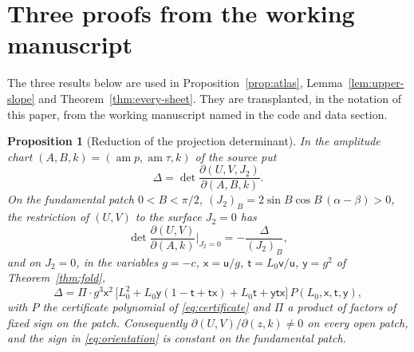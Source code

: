 \documentclass[11pt]{article}
\newtheorem{proposition}[theorem]{Proposition}
\theoremstyle{remark}
\newcommand{\am}{\operatorname{am}}
\begin{document}
\appendix
\section{Three proofs from the working manuscript}\label{app:proofs}

The three results below are used in Proposition~\ref{prop:atlas},
Lemma~\ref{lem:upper-slope} and Theorem~\ref{thm:every-sheet}.  They are
transplanted, in the notation of this paper, from the working manuscript
named in the code and data section.

\begin{proposition}[Reduction of the projection determinant]\label{prop:app-projection}
In the amplitude chart $(A,B,k)=(\am p,\am\tau,k)$ of the source put
\[
 \Delta=\det\frac{\partial(U,V,J_2)}{\partial(A,B,k)} .
\]
On the fundamental patch $0<B<\pi/2$, $(J_2)_B=2\sin B\cos B\,(\alpha-\beta)>0$,
the restriction of $(U,V)$ to the surface $J_2=0$ has
\begin{equation}\label{eq:app-projection-restriction}
 \det\frac{\partial(U,V)}{\partial(A,k)}\Big|_{J_2=0}=-\frac{\Delta}{(J_2)_B},
\end{equation}
and on $J_2=0$, in the variables $g=-c$, $\mathsf x=\mathsf u/g$,
$\mathsf t=L_0\mathsf v/\mathsf u$, $\mathsf y=g^2$ of Theorem~\ref{thm:fold},
\begin{equation}\label{eq:app-projection-reduction}
 \Delta=\Pi\cdot g^3\mathsf x^2\,
 \bigl[L_0^2+L_0\mathsf y(1-\mathsf t+\mathsf t\mathsf x)+L_0\mathsf t+\mathsf y\mathsf t\mathsf x\bigr]\,
 P(L_0,\mathsf x,\mathsf t,\mathsf y),
\end{equation}
with $P$ the certificate polynomial of \eqref{eq:certificate} and $\Pi$ a
product of factors of fixed sign on the patch.  Consequently
$\partial(U,V)/\partial(z,k)\ne0$ on every open patch, and the sign in
\eqref{eq:orientation} is constant on the fundamental patch.
\end{proposition}
\end{document}

